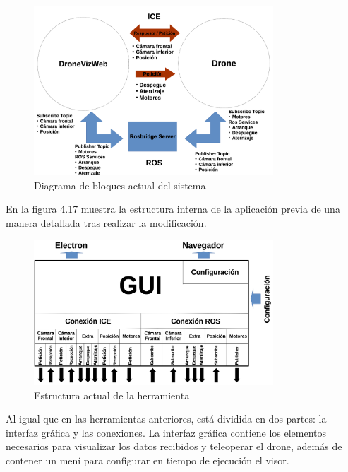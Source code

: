 \begin{figure}[H]
  \begin{center}
    \includegraphics[width=0.8\textwidth]{figures/DroneViz2.png}
		\caption{Diagrama de bloques actual del sistema}
		\label{fig.esquemaTurtleBot2}
		\end{center}
\end{figure}

En la figura 4.17 muestra la estructura interna de la aplicación previa de una manera detallada tras realizar la modificación.

\begin{figure}[H]
  \begin{center}
    \includegraphics[width=0.8\textwidth]{figures/estrucuturadroneviz2.png}
		\caption{Estructura actual de la herramienta}
		\label{fig.estructuracamviz2}
		\end{center}
\end{figure}

Al igual que en las herramientas anteriores, está dividida en dos partes: la interfaz gráfica y las conexiones. La interfaz gráfica contiene los elementos necesarios para visualizar los datos recibidos y teleoperar el drone, además de contener un mení para configurar en tiempo de ejecución el visor.

